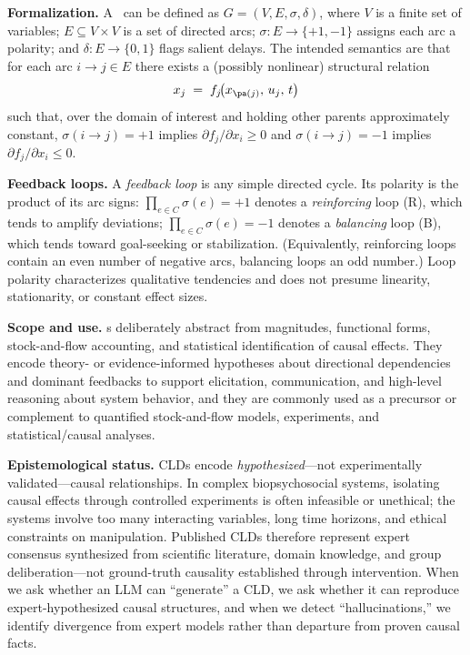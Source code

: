 \documentclass[12pt]{article}
\begin{document}
\medskip
\noindent
\textbf{Formalization.} A \CLD\ can be defined as \(G=(V,E,\sigma,\delta)\), where \(V\) is a finite set of variables; \(E\subseteq V\times V\) is a set of directed arcs; \(\sigma:E\to\{+1,-1\}\) assigns each arc a polarity; and \(\delta:E\to\{0,1\}\) flags salient delays. The intended semantics are that for each arc \(i\!\to\!j\in E\) there exists a (possibly nonlinear) structural relation
\[
x_j \;=\; f_j\!\bigl(x_{\pa(j)},\,u_j,\,t\bigr)
\]
such that, over the domain of interest and holding other parents approximately constant, \(\sigma(i\!\to\!j)=+1\) implies \(\partial f_j/\partial x_i \ge 0\) and \(\sigma(i\!\to\!j)=-1\) implies \(\partial f_j/\partial x_i \le 0\).

\medskip
\noindent
\textbf{Feedback loops.} A \emph{feedback loop} is any simple directed cycle. Its polarity is the product of its arc signs: \(\prod_{e\in C}\sigma(e)=+1\) denotes a \emph{reinforcing} loop (R), which tends to amplify deviations; \(\prod_{e\in C}\sigma(e)=-1\) denotes a \emph{balancing} loop (B), which tends toward goal-seeking or stabilization. (Equivalently, reinforcing loops contain an even number of negative arcs, balancing loops an odd number.) Loop polarity characterizes qualitative tendencies and does not presume linearity, stationarity, or constant effect sizes.

\medskip
\noindent
\textbf{Scope and use.} \CLD s deliberately abstract from magnitudes, functional forms, stock-and-flow accounting, and statistical identification of causal effects. They encode theory- or evidence-informed hypotheses about directional dependencies and dominant feedbacks to support elicitation, communication, and high-level reasoning about system behavior, and they are commonly used as a precursor or complement to quantified stock-and-flow models, experiments, and statistical/causal analyses.

\medskip
\noindent
\textbf{Epistemological status.} CLDs encode \emph{hypothesized}---not experimentally validated---causal relationships. In complex biopsychosocial systems, isolating causal effects through controlled experiments is often infeasible or unethical; the systems involve too many interacting variables, long time horizons, and ethical constraints on manipulation. Published CLDs therefore represent expert consensus synthesized from scientific literature, domain knowledge, and group deliberation---not ground-truth causality established through intervention. When we ask whether an LLM can ``generate'' a CLD, we ask whether it can reproduce expert-hypothesized causal structures, and when we detect ``hallucinations,'' we identify divergence from expert models rather than departure from proven causal facts.
\end{document}
